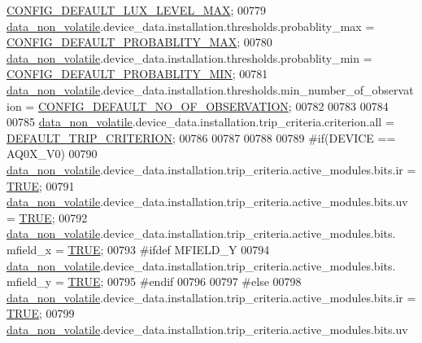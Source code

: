 \begin{DoxyCode}
      \hyperlink{a00021_a04ab25767fbb61ec61784da889ec8c09}{CONFIG\_DEFAULT\_LUX\_LEVEL\_MAX};
00779         \hyperlink{a00060_a76ac5f917f5308dcd83de0d7c94559fb}{data\_non\_volatile}.device\_data.installation.thresholds.probablity\_max            = 
      \hyperlink{a00021_a96cf926b530a1d5968881620d2f10445}{CONFIG\_DEFAULT\_PROBABLITY\_MAX};
00780         \hyperlink{a00060_a76ac5f917f5308dcd83de0d7c94559fb}{data\_non\_volatile}.device\_data.installation.thresholds.probablity\_min            = 
      \hyperlink{a00021_a599be42d4b357badb7c9b16a124a186a}{CONFIG\_DEFAULT\_PROBABLITY\_MIN};
00781         \hyperlink{a00060_a76ac5f917f5308dcd83de0d7c94559fb}{data\_non\_volatile}.device\_data.installation.thresholds.min\_number\_of\_observation = 
      \hyperlink{a00021_af69b35a9f07bfcfe500538565d898c65}{CONFIG\_DEFAULT\_NO\_OF\_OBSERVATION};
00782 
00783 
00784 
00785         \hyperlink{a00060_a76ac5f917f5308dcd83de0d7c94559fb}{data\_non\_volatile}.device\_data.installation.trip\_criteria.criterion.all          = 
      \hyperlink{a00022_a0ff9495f8521ea7698e83e7b4d6a6985}{DEFAULT\_TRIP\_CRITERION};
00786 
00787 
00788         
00789 \textcolor{preprocessor}{#if(DEVICE == AQ0X\_V0)}
00790         \hyperlink{a00060_a76ac5f917f5308dcd83de0d7c94559fb}{data\_non\_volatile}.device\_data.installation.trip\_criteria.active\_modules.bits.ir   
              = \hyperlink{a00040_aa8cecfc5c5c054d2875c03e77b7be15d}{TRUE};
00791         \hyperlink{a00060_a76ac5f917f5308dcd83de0d7c94559fb}{data\_non\_volatile}.device\_data.installation.trip\_criteria.active\_modules.bits.uv   
              = \hyperlink{a00040_aa8cecfc5c5c054d2875c03e77b7be15d}{TRUE};
00792         \hyperlink{a00060_a76ac5f917f5308dcd83de0d7c94559fb}{data\_non\_volatile}.device\_data.installation.trip\_criteria.active\_modules.bits.
      mfield\_x     = \hyperlink{a00040_aa8cecfc5c5c054d2875c03e77b7be15d}{TRUE};
00793 \textcolor{preprocessor}{        #ifdef MFIELD\_Y}
00794         \hyperlink{a00060_a76ac5f917f5308dcd83de0d7c94559fb}{data\_non\_volatile}.device\_data.installation.trip\_criteria.active\_modules.bits.
      mfield\_y     = \hyperlink{a00040_aa8cecfc5c5c054d2875c03e77b7be15d}{TRUE};
00795 \textcolor{preprocessor}{        #endif}
00796 
00797 \textcolor{preprocessor}{#else}
00798         \hyperlink{a00060_a76ac5f917f5308dcd83de0d7c94559fb}{data\_non\_volatile}.device\_data.installation.trip\_criteria.active\_modules.bits.ir   
              = \hyperlink{a00040_aa8cecfc5c5c054d2875c03e77b7be15d}{TRUE};
00799         \hyperlink{a00060_a76ac5f917f5308dcd83de0d7c94559fb}{data\_non\_volatile}.device\_data.installation.trip\_criteria.active\_modules.bits.uv   

\end{DoxyCode}
